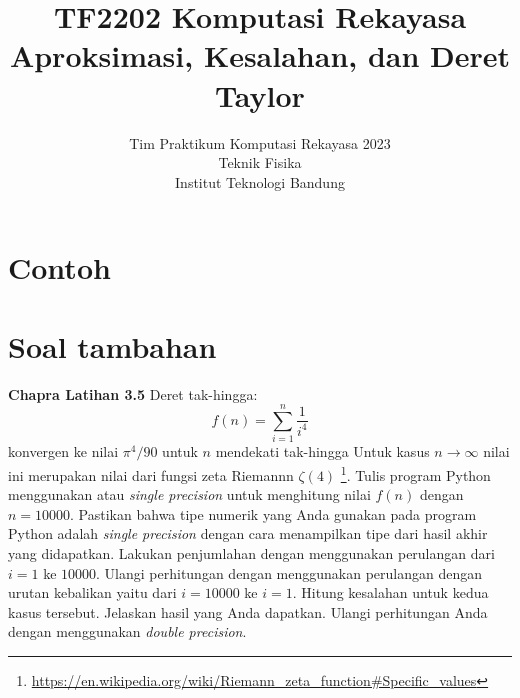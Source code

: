 



\title{%
{\small TF2202 Komputasi Rekayasa}\\
Aproksimasi, Kesalahan, dan Deret Taylor
}
\author{Tim Praktikum Komputasi Rekayasa 2023\\
Teknik Fisika\\
Institut Teknologi Bandung}
\date{}
\maketitle


\section{Contoh}








\section{Soal tambahan}

\begin{soal}
\textbf{Chapra Latihan 3.5}
Deret tak-hingga:
\begin{equation*}
f(n) = \sum_{i=1}^{n} \frac{1}{i^4}
\end{equation*}
konvergen ke nilai $\pi^{4}/90$ untuk $n$ mendekati tak-hingga
Untuk kasus $n \rightarrow \infty$ nilai ini merupakan nilai dari fungsi
zeta Riemannn $\zeta(4)$
\footnote{{\scriptsize\url{https://en.wikipedia.org/wiki/Riemann_zeta_function\#Specific_values}}}.
Tulis program Python menggunakan  atau
\textit{single precision} untuk menghitung
nilai $f(n)$ dengan $n=10000$.
Pastikan bahwa tipe numerik yang Anda gunakan pada program Python
adalah \textit{single precision} dengan cara menampilkan tipe dari hasil akhir yang didapatkan.
Lakukan penjumlahan dengan menggunakan perulangan
dari $i=1$ ke $10000$. Ulangi perhitungan dengan menggunakan perulangan
dengan urutan kebalikan yaitu dari $i=10000$ ke $i=1$. Hitung kesalahan untuk
kedua kasus tersebut.
Jelaskan hasil yang Anda dapatkan.
Ulangi perhitungan Anda dengan menggunakan \textit{double precision}.
\end{soal}

